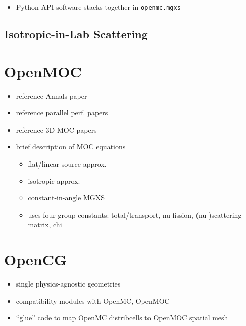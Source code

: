 \begin{itemize}[noitemsep]
  \item Python \ac{API} software stacks together in \texttt{openmc.mgxs}
\end{itemize}

\subsection{Isotropic-in-Lab Scattering}
\label{sec:chap3-iso-in-lab}


\section{OpenMOC}
\label{sec:chap3-openmoc}

\begin{itemize}[noitemsep]
  \item reference Annals paper
  \item reference parallel perf. papers
  \item reference 3D \ac{MOC} papers
  \item brief description of \ac{MOC} equations
  \begin{itemize}[noitemsep]
    \item flat/linear source approx.
    \item isotropic approx.
    \item constant-in-angle \ac{MGXS}
    \item uses four group constants: total/transport, nu-fission, (nu-)scattering matrix, chi
  \end{itemize}
\end{itemize}


\section{OpenCG}
\label{sec:chap3-opencg}

\begin{itemize}[noitemsep]
  \item single physics-agnostic geometries
  \item compatibility modules with OpenMC, OpenMOC
  \item ``glue'' code to map OpenMC distribcells to OpenMOC spatial mesh
\end{itemize}

